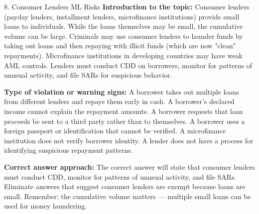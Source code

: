 \documentclass[11pt,a4paper]{beamer}
\begin{document}
\begin{frame}{8. Consumer Lenders ML Risks}
\tiny
\noindent\textbf{Introduction to the topic:} Consumer lenders (payday lenders, installment lenders, microfinance institutions) provide small loans to individuals. While the loans themselves may be small, the cumulative volume can be large. Criminals may use consumer lenders to launder funds by taking out loans and then repaying with illicit funds (which are now "clean" repayments). Microfinance institutions in developing countries may have weak AML controls. Lenders must conduct CDD on borrowers, monitor for patterns of unusual activity, and file SARs for suspicious behavior.

\vspace{0.1cm}
\noindent\textbf{Type of violation or warning signs:} A borrower takes out multiple loans from different lenders and repays them early in cash. A borrower's declared income cannot explain the repayment amounts. A borrower requests that loan proceeds be sent to a third party rather than to themselves. A borrower uses a foreign passport or identification that cannot be verified. A microfinance institution does not verify borrower identity. A lender does not have a process for identifying suspicious repayment patterns.

\vspace{0.1cm}
\noindent\textbf{Correct answer approach:} The correct answer will state that consumer lenders must conduct CDD, monitor for patterns of unusual activity, and file SARs. Eliminate answers that suggest consumer lenders are exempt because loans are small. Remember: the cumulative volume matters — multiple small loans can be used for money laundering.
\end{frame}
\end{document}
